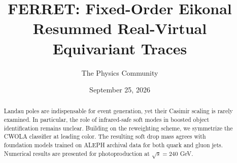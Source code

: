 \documentclass[11pt]{article}
\title{FERRET: Fixed-Order Eikonal Resummed Real-Virtual Equivariant Traces}
\author{The Physics Community}
\date{September 25, 2026}
\begin{document}
\maketitle
\begin{abstract}
Landau poles are indispensable for event generation, yet their Casimir
scaling is rarely examined. In particular, the role of infrared-safe
soft modes in boosted object identification remains unclear. Building on
the reweighting scheme, we symmetrize the CWOLA classifier at leading
color. The resulting soft drop mass agrees with foundation models
trained on ALEPH archival data for both quark and gluon jets. Numerical
results are presented for photoproduction at $\sqrt{s} = 240$ GeV.
\end{abstract}
\tableofcontents





\nocite{*}


\end{document}
